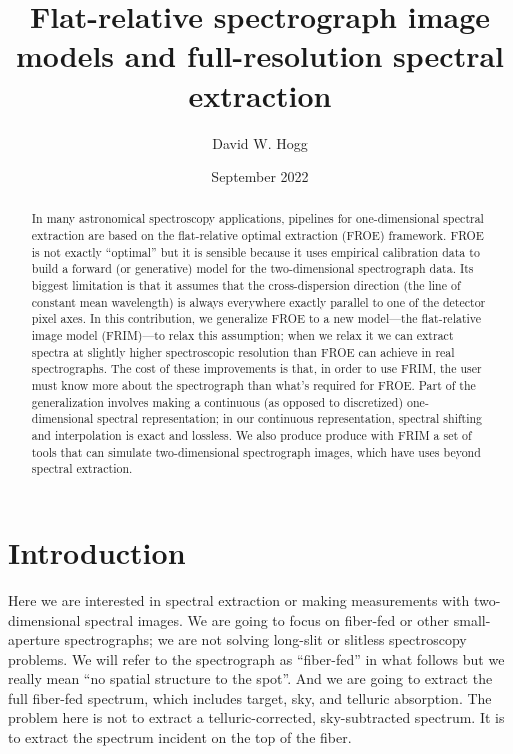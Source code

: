 \documentclass[modern]{aastex631}
\begin{document}
\title{Flat-relative spectrograph image models and full-resolution spectral extraction}

\author{David W. Hogg}

\date{September 2022}

\begin{abstract}\noindent
    In many astronomical spectroscopy applications, pipelines for one-dimensional spectral extraction are based on the flat-relative optimal extraction (FROE) framework.
    FROE is not exactly ``optimal'' but it is sensible because it uses empirical calibration data to build a forward (or generative) model for the two-dimensional spectrograph data.
    Its biggest limitation is that it assumes that the cross-dispersion direction (the line of constant mean wavelength) is always everywhere exactly parallel to one of the detector pixel axes.
    In this contribution, we generalize FROE to a new model---the flat-relative image model (FRIM)---to relax this assumption; when we relax it we can extract spectra at slightly higher spectroscopic resolution than FROE can achieve in real spectrographs.
    The cost of these improvements is that, in order to use FRIM, the user must know more about the spectrograph than what's required for FROE.
    Part of the generalization involves making a continuous (as opposed to discretized) one-dimensional spectral representation;
    in our continuous representation, spectral shifting and interpolation is exact and lossless.
    We also produce produce with FRIM a set of tools that can simulate two-dimensional spectrograph images, which have uses beyond spectral extraction.
\end{abstract}


\section*{}
\clearpage
\section{Introduction}

Here we are interested in spectral extraction or making measurements with two-dimensional spectral images.
We are going to focus on fiber-fed or other small-aperture spectrographs; we are not solving long-slit or slitless spectroscopy problems.
We will refer to the spectrograph as ``fiber-fed'' in what follows but we really mean ``no spatial structure to the spot''.
And we are going to extract the full fiber-fed spectrum, which includes target, sky, and telluric absorption.
The problem here is not to extract a telluric-corrected, sky-subtracted spectrum.
It is to extract the spectrum incident on the top of the fiber.
\end{document}
